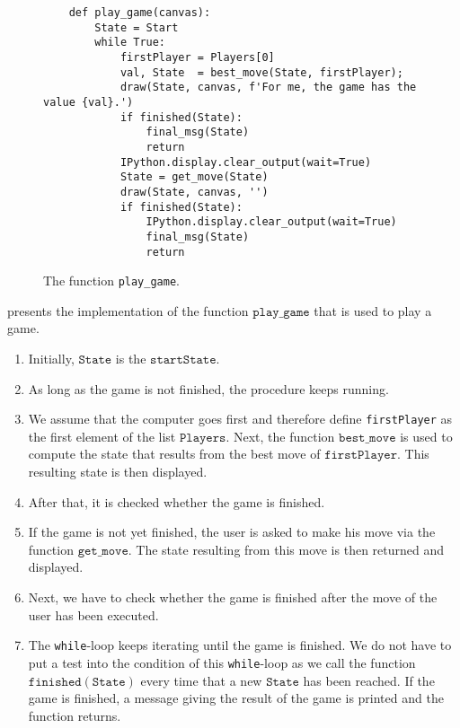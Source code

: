 \begin{figure}[!ht]
\centering
\begin{verbatim}
    def play_game(canvas):
        State = Start
        while True:
            firstPlayer = Players[0]
            val, State  = best_move(State, firstPlayer);
            draw(State, canvas, f'For me, the game has the value {val}.')
            if finished(State):
                final_msg(State)
                return
            IPython.display.clear_output(wait=True)
            State = get_move(State)
            draw(State, canvas, '')
            if finished(State):
                IPython.display.clear_output(wait=True)
                final_msg(State)
                return
\end{verbatim}
\caption{The function \texttt{play\_game}.}
\label{fig:Minimax.ipynb:play_game}
\end{figure}
\FloatBarrier

 presents the implementation of the function $\texttt{play\_game}$ that is used to play a game.
\begin{enumerate}
\item Initially, $\texttt{State}$ is the $\texttt{startState}$.
\item As long as the game is not finished, the procedure keeps running.
\item We assume that the computer goes first and therefore define  \texttt{firstPlayer} as the first
      element of the list $\texttt{Players}$.  Next, the function $\texttt{best\_move}$ is used to
      compute the state that results from the best move of $\texttt{firstPlayer}$.
      This resulting state is then displayed.
\item After that, it is checked whether the game is finished.
\item If the game is not  yet finished, the user is asked to make his move via the function
      $\texttt{get\_move}$. The state resulting from this move is then returned and displayed.
\item Next, we have to check whether the game is finished after the  move of the user has been executed.
\item The \texttt{while}-loop keeps iterating until the game is finished.
      We do not have to put a test into the condition of this \texttt{while}-loop as we call the function
      $\texttt{finished}(\texttt{State})$ every time that a new $\texttt{State}$ has been reached.
      If the game is finished, a message giving the result of the game is printed and the function returns.
\end{enumerate}

